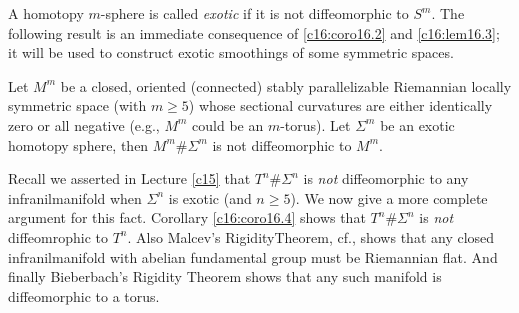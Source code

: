 A homotopy $m$-sphere is called {\em exotic} if it is not
diffeomorphic to $S^{m}$. The following result is an immediate
consequence of \ref{c16:coro16.2} and \ref{c16:lem16.3}; it will be
used to construct exotic smoothings of some symmetric spaces.

\begin{coro}\label{c16:coro16.4}
Let $M^{m}$ be a closed, oriented (connected) stably parallelizable
Riemannian locally symmetric space (with $m\geq 5$) whose sectional
curvatures are either identically zero or all negative (e.g., $M^{m}$
could be an $m$-torus). Let $\Sigma^{m}$ be an exotic homotopy sphere,
then $M^{m}\# \Sigma^{m}$ is not diffeomorphic to $M^{m}$.
\end{coro}

\begin{remark*}
Recall we asserted in Lecture \ref{c15} that $T^{n}\# \Sigma^{n}$ is
{\em not} diffeomorphic to any infranilmanifold when $\Sigma^{n}$ is
exotic (and $n\geq 5$). We now give a more complete argument for this
fact. Corollary \ref{c16:coro16.4} shows that $T^{n}\# \Sigma^{n}$ is
{\em not} diffeomrophic to $T^{n}$. Also Malcev's
Rigidity\pageoriginale Theorem, cf.\@ \cite{70}, shows that any closed
infranilmanifold with abelian fundamental group must be Riemannian
flat. And finally Bieberbach's Rigidity Theorem shows that any such
manifold is diffeomorphic to a torus.
\end{remark*}


